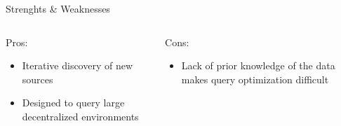 \begin{frame}{Strenghts \& Weaknesses}
    \begin{columns}[T] %
        \begin{column}{.48\textwidth}
            \color{green}Pros:
            \begin{itemize}
                \item Iterative discovery of new sources
                \item Designed to query large decentralized environments
            \end{itemize}
        \end{column}%
    \hfill%
        \begin{column}{.48\textwidth}
            \color{red}Cons:
            \begin{itemize}
                \item Lack of prior knowledge of the data makes query optimization difficult
            \end{itemize}
        \end{column}%
    \end{columns}
\end{frame}




